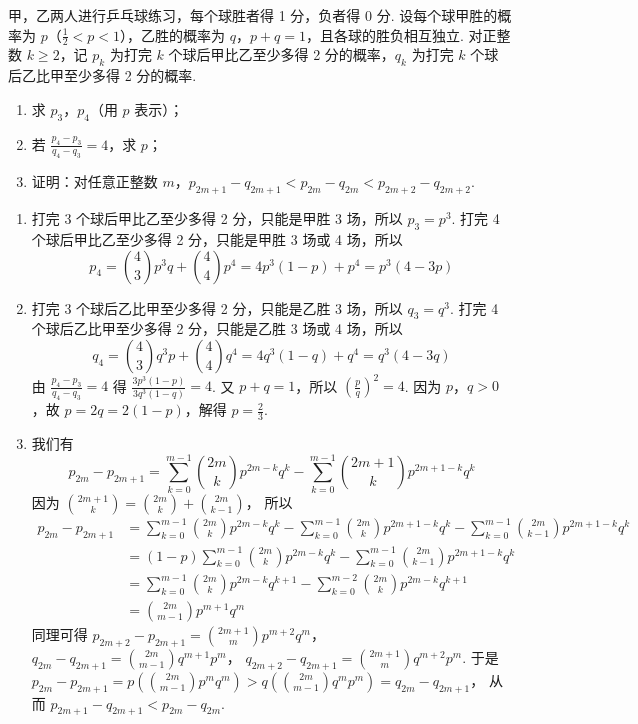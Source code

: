\begin{problem}
甲，乙两人进行乒乓球练习，每个球胜者得 1 分，负者得 0 分. 设每个球甲胜的概率为 \(p\)（\(\frac12<p<1\)），乙胜的概率为 \(q\)，\(p+q=1\)，且各球的胜负相互独立. 对正整数 \(k\ge 2\)，记 \(p_k\) 为打完 \(k\) 个球后甲比乙至少多得 2 分的概率，\(q_k\) 为打完 \(k\) 个球后乙比甲至少多得 2 分的概率.
\begin{enumerate}
\item 求 \(p_3\)，\(p_4\)（用 \(p\) 表示）；
\item 若 \(\frac{p_4-p_3}{q_4-q_3}=4\)，求 \(p\)；
\item 证明：对任意正整数 \(m\)，\(p_{2m+1}-q_{2m+1}<p_{2m}-q_{2m}<p_{2m+2}-q_{2m+2}\).
\end{enumerate}
\end{problem}

\begin{solution}
\begin{enumerate}
\item 打完 3 个球后甲比乙至少多得 2 分，只能是甲胜 3 场，所以
\(p_3=p^3\).
打完 4 个球后甲比乙至少多得 2 分，只能是甲胜 3 场或 4 场，所以
\[
p_4=\binom43 p^3q+\binom44 p^4
=4p^3(1-p)+p^4
=p^3(4-3p)
\]

\item 打完 3 个球后乙比甲至少多得 2 分，只能是乙胜 3 场，所以
\(q_3=q^3\).
打完 4 个球后乙比甲至少多得 2 分，只能是乙胜 3 场或 4 场，所以
\[
q_4=\binom43 q^3p+\binom44 q^4
=4q^3(1-q)+q^4
=q^3(4-3q)
\]
由
\(\frac{p_4-p_3}{q_4-q_3}=4\)
得
\(\frac{3p^3(1-p)}{3q^3(1-q)}=4\).
又 \(p+q=1\)，所以
\(\left(\frac{p}{q}\right)^2=4\).
因为 \(p\)，\(q>0\)，故 \(p=2q=2(1-p)\)，解得
\(p=\frac23\).

\item 我们有
\[
p_{2m}-p_{2m+1}
=\sum_{k=0}^{m-1}\binom{2m}{k}p^{2m-k}q^k
-\sum_{k=0}^{m-1}\binom{2m+1}{k}p^{2m+1-k}q^k
\]
因为
\(\binom{2m+1}{k}=\binom{2m}{k}+\binom{2m}{k-1}\)，
所以
\begin{align*}
p_{2m}-p_{2m+1}
&=\sum_{k=0}^{m-1}\binom{2m}{k}p^{2m-k}q^k
-\sum_{k=0}^{m-1}\binom{2m}{k}p^{2m+1-k}q^k
-\sum_{k=0}^{m-1}\binom{2m}{k-1}p^{2m+1-k}q^k \\
&=(1-p)\sum_{k=0}^{m-1}\binom{2m}{k}p^{2m-k}q^k
-\sum_{k=0}^{m-1}\binom{2m}{k-1}p^{2m+1-k}q^k \\
&=\sum_{k=0}^{m-1}\binom{2m}{k}p^{2m-k}q^{k+1}
-\sum_{k=0}^{m-2}\binom{2m}{k}p^{2m-k}q^{k+1} \\
&=\binom{2m}{m-1}p^{m+1}q^m
\end{align*}
同理可得
\(p_{2m+2}-p_{2m+1}=\binom{2m+1}{m}p^{m+2}q^m\)，
\(q_{2m}-q_{2m+1}=\binom{2m}{m-1}q^{m+1}p^m\)，
\(q_{2m+2}-q_{2m+1}=\binom{2m+1}{m}q^{m+2}p^m\).
于是
\(
p_{2m}-p_{2m+1}
=p\left(\binom{2m}{m-1}p^mq^m\right)
>q\left(\binom{2m}{m-1}q^mp^m\right)
=q_{2m}-q_{2m+1}
\)，
从而
\(p_{2m+1}-q_{2m+1}<p_{2m}-q_{2m}\).


\end{enumerate}
\end{solution}
